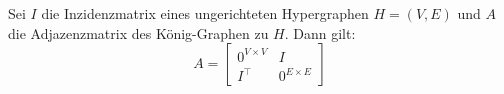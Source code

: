 \begin{proposition}
    Sei $ I $ die Inzidenzmatrix eines ungerichteten Hypergraphen $ H = (V, E) $ und $ A $ die Adjazenzmatrix des König-Graphen zu $ H $.
    Dann gilt:
    \begin{equation*}
        A = \begin{bmatrix}
            0^{V \times V} & I \\
            I^\top & 0^{E \times E}
        \end{bmatrix}
    \end{equation*}
\end{proposition}
